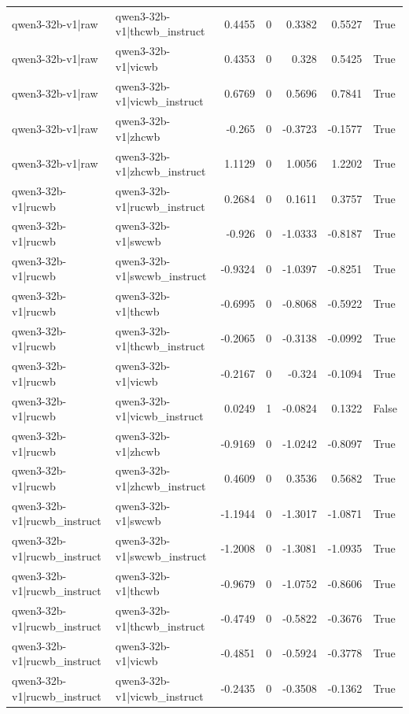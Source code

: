 \begin{table}
\begin{tabular}{l l r r r r l}
qwen3-32b-v1|raw & qwen3-32b-v1|thcwb_instruct & 0.4455 & 0 & 0.3382 & 0.5527 & True \\
qwen3-32b-v1|raw & qwen3-32b-v1|vicwb & 0.4353 & 0 & 0.328 & 0.5425 & True \\
qwen3-32b-v1|raw & qwen3-32b-v1|vicwb_instruct & 0.6769 & 0 & 0.5696 & 0.7841 & True \\
qwen3-32b-v1|raw & qwen3-32b-v1|zhcwb & -0.265 & 0 & -0.3723 & -0.1577 & True \\
qwen3-32b-v1|raw & qwen3-32b-v1|zhcwb_instruct & 1.1129 & 0 & 1.0056 & 1.2202 & True \\
qwen3-32b-v1|rucwb & qwen3-32b-v1|rucwb_instruct & 0.2684 & 0 & 0.1611 & 0.3757 & True \\
qwen3-32b-v1|rucwb & qwen3-32b-v1|swcwb & -0.926 & 0 & -1.0333 & -0.8187 & True \\
qwen3-32b-v1|rucwb & qwen3-32b-v1|swcwb_instruct & -0.9324 & 0 & -1.0397 & -0.8251 & True \\
qwen3-32b-v1|rucwb & qwen3-32b-v1|thcwb & -0.6995 & 0 & -0.8068 & -0.5922 & True \\
qwen3-32b-v1|rucwb & qwen3-32b-v1|thcwb_instruct & -0.2065 & 0 & -0.3138 & -0.0992 & True \\
qwen3-32b-v1|rucwb & qwen3-32b-v1|vicwb & -0.2167 & 0 & -0.324 & -0.1094 & True \\
qwen3-32b-v1|rucwb & qwen3-32b-v1|vicwb_instruct & 0.0249 & 1 & -0.0824 & 0.1322 & False \\
qwen3-32b-v1|rucwb & qwen3-32b-v1|zhcwb & -0.9169 & 0 & -1.0242 & -0.8097 & True \\
qwen3-32b-v1|rucwb & qwen3-32b-v1|zhcwb_instruct & 0.4609 & 0 & 0.3536 & 0.5682 & True \\
qwen3-32b-v1|rucwb_instruct & qwen3-32b-v1|swcwb & -1.1944 & 0 & -1.3017 & -1.0871 & True \\
qwen3-32b-v1|rucwb_instruct & qwen3-32b-v1|swcwb_instruct & -1.2008 & 0 & -1.3081 & -1.0935 & True \\
qwen3-32b-v1|rucwb_instruct & qwen3-32b-v1|thcwb & -0.9679 & 0 & -1.0752 & -0.8606 & True \\
qwen3-32b-v1|rucwb_instruct & qwen3-32b-v1|thcwb_instruct & -0.4749 & 0 & -0.5822 & -0.3676 & True \\
qwen3-32b-v1|rucwb_instruct & qwen3-32b-v1|vicwb & -0.4851 & 0 & -0.5924 & -0.3778 & True \\
qwen3-32b-v1|rucwb_instruct & qwen3-32b-v1|vicwb_instruct & -0.2435 & 0 & -0.3508 & -0.1362 & True \\

\end{tabular}
\end{table}
